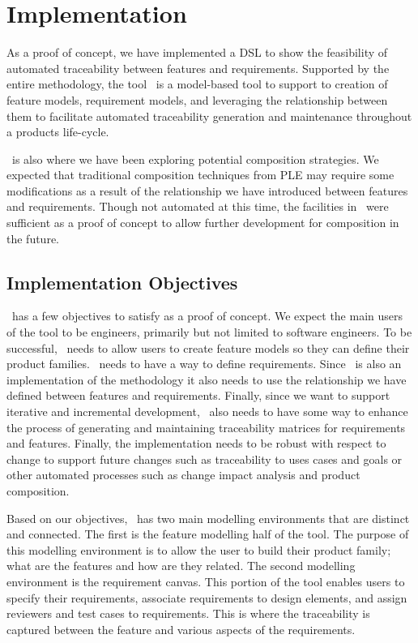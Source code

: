 \chapter{Implementation}

As a proof of concept, we have implemented a \ac{DSL} to show the feasibility of automated traceability between features and requirements. Supported by the entire methodology, the tool \tool\ is a model-based tool to support to creation of feature models, requirement models, and leveraging the relationship between them to facilitate automated traceability generation and maintenance throughout a products life-cycle.

\tool\ is also where we have been exploring potential composition strategies. We expected that traditional composition techniques from \ac{PLE} may require some modifications as a result of the relationship we have introduced between features and requirements. Though not automated at this time, the facilities in \tool\ were sufficient as a proof of concept to allow further development for composition in the future.

\section{Implementation Objectives}

\tool\ has a few objectives to satisfy as a proof of concept. We expect the main users of the tool to be engineers, primarily but not limited to software engineers. To be successful, \tool\ needs to allow users to create feature models so they can define their product families. \tool\ needs to have a way to define requirements. Since \tool\ is also an implementation of the methodology it also needs to use the relationship we have defined between features and requirements. Finally, since we want to support iterative and incremental development, \tool\ also needs to have some way to enhance the process of generating and maintaining traceability matrices for requirements and features. Finally, the implementation needs to be robust with respect to change to support future changes such as traceability to uses cases and goals or other automated processes such as change impact analysis and product composition.

Based on our objectives, \tool\ has two main modelling environments that are distinct and connected. The first is the feature modelling half of the tool. The purpose of this modelling environment is to allow the user to build their product family; what are the features and how are they related. The second modelling environment is the requirement canvas. This portion of the tool enables users to specify their requirements, associate requirements to design elements, and assign reviewers and test cases to requirements. This is where the traceability is captured between the feature and various aspects of the requirements. 

